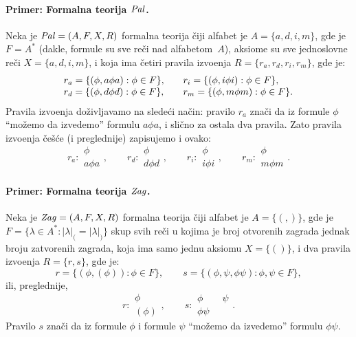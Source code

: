 \paragraph{Primer: Formalna teorija $\mathit{Pal}$.} Neka je $\mathit{Pal} = (A, F, X, R)$ formalna teorija \v ciji alfabet je
$A = \{a, d, i, m\}$, gde je $F = A^*$ (dakle, formule su sve re\v ci nad alfabetom~$A$),
aksiome su sve jednoslovne re\v ci $X = \{a, d, i, m\}$, i koja ima \v cetiri pravila izvo\dj enja $R = \{r_a, r_d, r_i, r_m\}$, gde je:
$$
  \begin{array}{l@{\qquad}l}
  r_a = \{(\phi, a\phi a) : \phi \in F\}, & r_i = \{(\phi, i\phi i) : \phi \in F\},\\
  r_d = \{(\phi, d\phi d) : \phi \in F\}, & r_m = \{(\phi, m\phi m) : \phi \in F\}.
  \end{array}
$$
Pravila izvo\dj enja do\v zivljavamo na slede\'ci na\v cin: pravilo $r_a$ zna\v ci da iz formule $\phi$
``mo\v zemo da izvedemo'' formulu $a \phi a$, i sli\v cno za ostala dva pravila. Zato pravila izvo\dj enja
\v ce\v s\'ce (i preglednije) zapisujemo i ovako:
$$
  r_a : \begin{array}{c}
    \phi \\ \hline
    a \phi a
  \end{array}, \qquad
  r_d : \begin{array}{c}
    \phi \\ \hline
    d \phi d
  \end{array}, \qquad
  r_i : \begin{array}{c}
    \phi \\ \hline
    i \phi i
  \end{array}, \qquad
  r_m : \begin{array}{c}
    \phi \\ \hline
    m \phi m
  \end{array}.
$$

\paragraph{Primer: Formalna teorija $\mathit{Zag}$.} Neka je $\mathit{Zag} = (A, F, X, R)$ formalna teorija \v ciji alfabet je
$A = \{(, )\}$, gde je
$
  F = \{ \lambda \in A^* : |\lambda|_( = |\lambda|_)\}
$
skup svih re\v ci u kojima je broj otvorenih zagrada jednak broju zatvorenih zagrada,
koja ima samo jednu aksiomu $X = \{()\}$, i dva pravila izvo\dj enja $R = \{r, s\}$, gde je:
$$
  r = \{(\phi, (\phi)) : \phi \in F\}, \qquad s = \{(\phi, \psi, \phi\psi) : \phi, \psi \in F\},
$$
ili, preglednije,
$$
  r : \begin{array}{c}
    \phi \\ \hline
    (\phi)
  \end{array}, \qquad
  s : \begin{array}{c}
    \phi \qquad \psi \\ \hline
    \phi\psi
  \end{array}.
$$
Pravilo $s$ zna\v ci da iz formule $\phi$ i formule $\psi$ ``mo\v zemo da izvedemo'' formulu $\phi\psi$.

